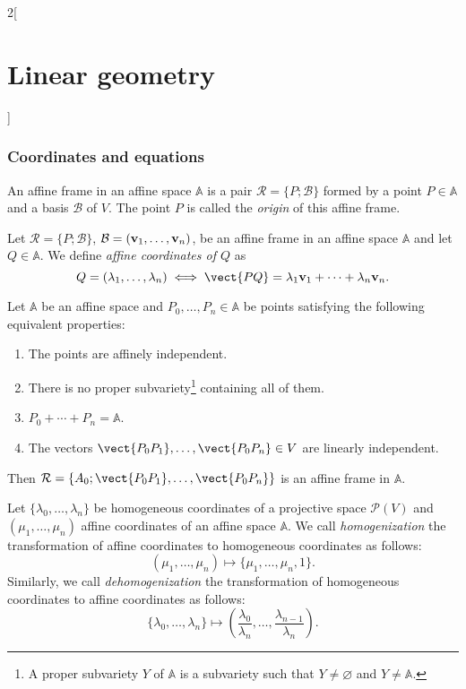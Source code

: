 \documentclass[../../../main.tex]{subfiles}
\begin{document}
\begin{multicols}{2}[\section{Linear geometry}]
    \subsubsection*{Coordinates and equations}
    \begin{definition}
        An affine frame in an affine space $\mathbb{A}$ is a pair $\mathcal{R}=\{P;\mathcal{B}\}$ formed by a point $P\in\mathbb{A}$ and a basis $\mathcal{B}$ of $V$. The point $P$ is called the \textit{origin} of this affine frame.
    \end{definition}
    \begin{definition}
        Let $\mathcal{R}=\{P;\mathcal{B}\}$, $\mathcal{B}=(\vb{v}_1,\ldots,\vb{v}_n)$, be an affine frame in an affine space $\mathbb{A}$ and let $Q\in\mathbb{A}$. We define \textit{affine coordinates of $Q$} as $$Q=(\lambda_1,\ldots,\lambda_n)\iff\vect{PQ}=\lambda_1\mathblack{v}_1+\cdots+\lambda_n\mathblack{v}_n.$$
    \end{definition}
    \begin{prop}
        Let $\mathbb{A}$ be an affine space and $P_0,\ldots,P_n\in\mathbb{A}$ be points satisfying the following equivalent properties:
        \begin{enumerate}
            \item The points are affinely independent.
            \item There is no proper subvariety\footnote{A proper subvariety $Y$ of $\mathbb{A}$ is a subvariety such that $Y\ne\varnothing$ and  $Y\ne\mathbb{A}$.} containing all of them.
            \item $P_0+\cdots+P_n=\mathbb{A}$.
            \item The vectors $\vect{P_0P_1},\ldots,\vect{P_0P_n}\in V$ are linearly independent.
        \end{enumerate}
        Then $\mathcal{R}=\{A_0;\vect{P_0P_1},\ldots,\vect{P_0P_n}\}$ is an affine frame in $\mathbb{A}$.
    \end{prop}
    \begin{definition}
        Let $\{\lambda_0,\ldots,\lambda_n\}$ be homogeneous coordinates of a projective space $\mathcal{P}(V)$ and $(\mu_1,\ldots,\mu_n)$ affine coordinates of an affine space $\mathbb{A}$. We call \textit{homogenization} the transformation of affine coordinates to homogeneous coordinates as follows: $$(\mu_1,\ldots,\mu_n)\mapsto\{\mu_1,\ldots,\mu_n,1\}.$$ Similarly, we call \textit{dehomogenization} the transformation of homogeneous coordinates to affine coordinates as follows: $$\{\lambda_0,\ldots,\lambda_n\}\mapsto\left(\frac{\lambda_0}{\lambda_n},\ldots,\frac{\lambda_{n-1}}{\lambda_n}\right).$$

\end{definition}
\end{multicols}
\end{document}
